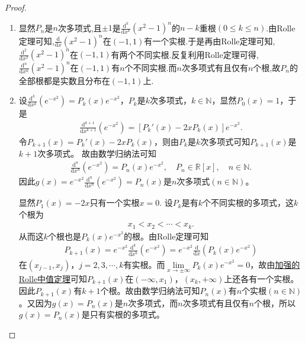 \documentclass[../../main.tex]{subfiles}
\begin{document}
\begin{proof}
\begin{enumerate}
\item 显然$P_n$是$n$次多项式,且$\pm 1$是$\frac{\mathrm{d}^k}{\mathrm{d}x^k}(x^2-1)^n$的$n-k$重根$(0\leqslant k\leqslant n)$.由Rolle定理可知,$\frac{\mathrm{d}}{\mathrm{d}x}(x^2-1)^n$在$(-1,1)$有一个实根.于是再由Rolle定理可知,$\frac{\mathrm{d}^2}{\mathrm{d}x^2}(x^2-1)^n$在$(-1,1)$有两个不同实根.反复利用Rolle定理可得,$\frac{\mathrm{d}^n}{\mathrm{d}x^n}(x^2-1)^n$在$(-1,1)$有$n$个不同实根.而$n$次多项式有且仅有$n$个根,故$P_n$的全部根都是实数且分布在$(-1,1)$上.

\item 设$\frac{\mathrm{d}^k}{\mathrm{d}x^k}(e^{-x^2}) = P_k(x)e^{-x^2}$，$P_k$是$k$次多项式，$k\in \mathbb{N}$，显然$P_0(x) = 1$，于是
\begin{align*}
\frac{\mathrm{d}^{k+1}}{\mathrm{d}x^{k+1}}(e^{-x^2}) = \left[ P_k'(x) - 2xP_k(x) \right] e^{-x^2}.
\end{align*}
令$P_{k+1}(x) = P_k'(x) - 2xP_k(x)$，则由$P_k$是$k$次多项式可知$P_{k+1}(x)$是$k+1$次多项式。
故由数学归纳法可知
\begin{align*}
\frac{\mathrm{d}^n}{\mathrm{d}x^n}(e^{-x^2}) = P_n(x)e^{-x^2}, \quad P_n \in \mathbb{R}[x], \quad n \in \mathbb{N}.
\end{align*}
因此$g(x) = e^{-x^2}\frac{\mathrm{d}^n}{\mathrm{d}x^n}(e^{-x^2}) = P_n(x)$是$n$次多项式$(n \in \mathbb{N})$。

显然$P_1(x)=-2x$只有一个实根$x=0$.
设$P_k$是有$k$个不同实根的多项式，这$k$个根为
\begin{align*}
x_1 < x_2 < \cdots < x_k.
\end{align*}
从而这$k$个根也是$P_k(x)e^{-x^2}$的根。由Rolle定理可知
\begin{align*}
P_{k+1}(x) = e^{-x^2}\frac{\mathrm{d}^k}{\mathrm{d}x^k}(e^{-x^2}) = e^{-x^2}\frac{\mathrm{d}}{\mathrm{d}x}\left( P_k(x)e^{-x^2} \right)
\end{align*}
在$(x_{j-1}, x_j)$，$j=2,3,\cdots,k$有实根。而$\lim\limits_{x \rightarrow \pm \infty} P_k(x)e^{-x^2} = 0$，故由\hyperref[theorem:加强的Rolle中值定理]{加强的Rolle中值定理}可知$P_{k+1}(x)$在$(-\infty, x_1)$，$(x_k, +\infty)$上还各有一个实根。因此$P_{k+1}(x)$有$k+1$个根。故由数学归纳法可知$P_n(x)$有$n$个实根$(n \in \mathbb{N})$。又因为$g(x) = P_n(x)$是$n$次多项式，而$n$次多项式有且仅有$n$个根，所以$g(x) = P_n(x)$是只有实根的多项式。
\end{enumerate}

\end{proof}
\end{document}
